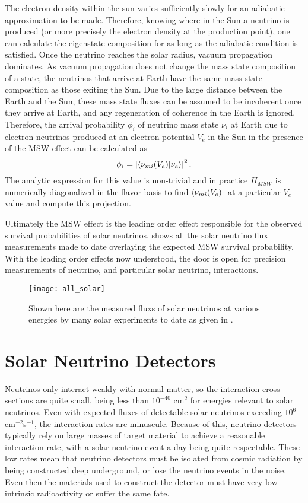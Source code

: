 The electron density within the sun varies sufficiently slowly for an adiabatic approximation to be made.
Therefore, knowing where in the Sun a neutrino is produced (or more precisely the electron density at the production point), one can calculate the eigenstate composition for as long as the adiabatic condition is satisfied.
Once the neutrino reaches the solar radius, vacuum propagation dominates. 
As vacuum propagation does not change the mass state composition of a state, the neutrinos that arrive at Earth have the same mass state composition as those exiting the Sun.
Due to the large distance between the Earth and the Sun, these mass state fluxes can be assumed to be incoherent once they arrive at Earth, and any regeneration of coherence in the Earth is ignored.
Therefore, the arrival probability $\phi_i$ of neutrino mass state $\nu_i$ at Earth due to electron neutrinos produced at an electron potential $V_e$ in the Sun in the presence of the MSW effect can be calculated as
\begin{equation}
\phi_i = \left| \braket{\nu_{m i}(V_e)}{\nu_e} \right|^2.
\label{rawflux}
\end{equation}
The analytic expression for this value is non-trivial and in practice $H_{MSW}$ is numerically diagonalized in the flavor basis to find $\bra{\nu_{m i}(V_e)}$ at a particular $V_e$ value and compute this projection.

Ultimately the MSW effect is the leading order effect responsible for the observed survival probabilities of solar neutrinos.
 shows all the solar neutrino flux measurements made to date overlaying the expected MSW survival probability.
With the leading order effects now understood, the door is open for precision measurements of neutrino, and particular solar neutrino, interactions.

\begin{figure}
\centering
\texttt{[image: all\_solar]}
\caption{\label{fig:global_solar}Shown here are the measured fluxs of solar neutrinos at various energies by many solar experiments to date as given in \cite{nonstandard_interactions}.}
\end{figure}

\chapter{Solar Neutrino Detectors}
\label{ch:detectors}

Neutrinos only interact weakly with normal matter, so the interaction cross sections are quite small, being less than $10^{-40}$ cm$^2$ for energies relevant to solar neutrinos.
Even with expected fluxes of detectable solar neutrinos exceeding $10^6$ cm$^{-2}$s$^{-1}$, the interaction rates are minuscule.
Because of this, neutrino detectors typically rely on large masses of target material to achieve a reasonable interaction rate, with a solar neutrino event a day being quite respectable.
These low rates mean that neutrino detectors must be isolated from cosmic radiation by being constructed deep underground, or lose the neutrino events in the noise.
Even then the materials used to construct the detector must have very low intrinsic radioactivity or suffer the same fate.


